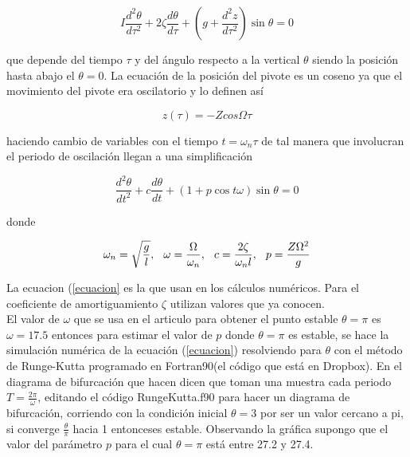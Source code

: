 \documentclass[10pt,twocolumn]{article}
\begin{document}
\begin{equation}
	I\frac{d^2\theta}{d\tau^2}+ 2\zeta\frac{d\theta}{d\tau}+\left( g + 
\frac{d^2z}{d\tau^2} \right)\sin\theta=0
\label{osciladoramortiguado}
\end{equation}

que depende del tiempo $\tau$ y del \'angulo respecto a la vertical $\theta$ 
siendo la posici\'on hasta abajo el $\theta=0$. La ecuaci\'on de la 
posici\'on del pivote es un coseno ya que el movimiento del pivote era 
oscilatorio y lo definen as\'i

\begin{equation}
	z(\tau)=-Zcos\Omega\tau
	\label{pospivote}
\end{equation}

haciendo cambio de variables con el tiempo $t=\omega_n\tau$ de tal manera 
que involucran el periodo de oscilaci\'on llegan a una simplificaci\'on

\begin{equation}
	\frac{d^2\theta}{dt^2}+c\frac{d\theta}{dt}+(1+p\cos t\omega)\sin\theta=0 
\label{ecuacion}
\end{equation}

donde 

\begin{equation}
	\omega_n=\sqrt{\frac{g}{l}}, \hspace{0.25cm} \omega=\frac{\Omega}{\omega_n}, \hspace{0.25cm} 
c=\frac{2\zeta}{\omega_nl}, \hspace{0.25cm} p=\frac{Z\Omega^2}{g}
\label{definiciones}
\end{equation}

La ecuacion (\ref{ecuacion} es la que usan en los c\'alculos 
num\'ericos. 
Para el coeficiente de amortiguamiento $\zeta$ utilizan valores que ya conocen. \\ \newline
El valor de $\omega$ que se usa en el articulo para obtener el punto estable $\theta=\pi$ es $\omega=17.5$ 
entonces para estimar el valor de $p$ donde $\theta=\pi$ es estable, se hace la simulaci\'on num\'erica de 
la 
ecuaci\'on (\ref{ecuacion}) resolviendo para $\theta$ con el m\'etodo de Runge-Kutta programado en 
Fortran90(el c\'odigo que est\'a en Dropbox). En el diagrama de bifurcaci\'on que hacen dicen que toman 
una 
muestra cada periodo $T=\frac{2\pi}{\omega}$, editando el c\'odigo RungeKutta.f90 para hacer un diagrama de 
bifurcaci\'on, corriendo con la condici\'on inicial $\theta=3$ por ser un valor cercano a pi, si converge 
$\frac{\theta}{\pi}$ hacia 1 entonceses estable. Observando la gr\'afica supongo que el valor del 
par\'ametro $p$ para el cual $\theta=\pi$ est\'a entre 27.2 y 27.4. 
\end{document}
